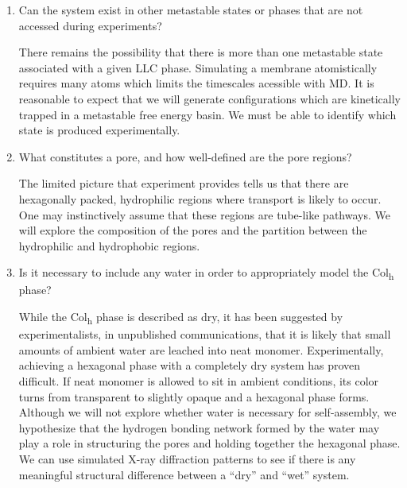 \documentclass{article}
\begin{document}
\begin{enumerate}
  \item Can the system exist in other metastable states or phases that are not
  accessed during experiments? \label{point:metastable}
  
  There remains the possibility that there is more than one metastable state
  associated with a given LLC phase. Simulating a membrane atomistically
  requires many atoms which limits the timescales acessible with MD. It is
  reasonable to expect that we will generate configurations which are kinetically
  trapped in a metastable free energy basin. We must be able to identify which
  state is produced experimentally.

  \item What constitutes a pore, and how well-defined are the pore regions? \label{point:poredefinition}

  The limited picture that experiment provides tells us that there are
  hexagonally packed, hydrophilic regions where transport is likely to occur.
  One may instinctively assume that these regions are tube-like pathways. We will
  explore the composition of the pores and the partition between the
  hydrophilic and hydrophobic regions. 

  \item Is it necessary to include any water in order to appropriately model
  the Col\textsubscript{h} phase? \label{point:water}

  While the Col\textsubscript{h} phase is described as dry, it has been
  suggested by experimentalists, in unpublished communications, that it is likely
  that small amounts of ambient water are leached into neat monomer.
  Experimentally, achieving a hexagonal phase with a completely dry system has
  proven difficult. If neat monomer is allowed to sit in ambient conditions, its
  color turns from transparent to slightly opaque and a hexagonal phase forms.
  Although we will not explore whether water is necessary for self-assembly, we
  hypothesize that the hydrogen bonding network formed by the water may play a
  role in structuring the pores and holding together the hexagonal phase. We can
  use simulated X-ray diffraction patterns to see if there is any meaningful
  structural difference between a ``dry'' and ``wet'' system.

  \end{enumerate}
  
 
\end{document}
